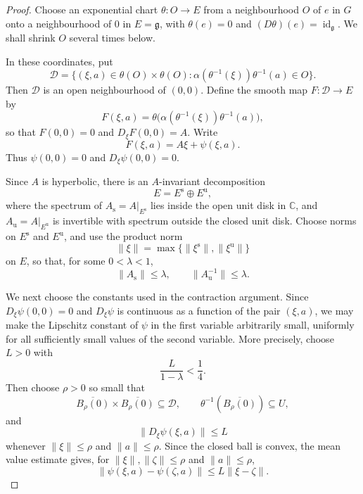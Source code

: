 \documentclass[12pt]{amsart}
\theoremstyle{definition}
\numberwithin{equation}{section}
\theoremstyle{remark}
\begin{document}
\begin{proof}
Choose an exponential chart $\theta:O\to E$ from a neighbourhood $O$ of
$e$ in $G$ onto a neighbourhood of $0$ in $E=\mathfrak g$, with
$\theta(e)=0$ and $(D\theta)(e)=\operatorname{id}_{\mathfrak g}$. We shall
shrink $O$ several times below.

In these coordinates, put
\[
\mathcal D=\{(\xi,a)\in\theta(O)\times\theta(O):
\alpha(\theta^{-1}(\xi))\theta^{-1}(a)\in O\}.
\]
Then $\mathcal D$ is an open neighbourhood of $(0,0)$. Define the smooth
map $F:\mathcal D\to E$ by
\[
F(\xi,a)=\theta\bigl(\alpha(\theta^{-1}(\xi))\theta^{-1}(a)\bigr),
\]
so that $F(0,0)=0$ and $D_\xi F(0,0)=A$. Write
\[
F(\xi,a)=A\xi+\psi(\xi,a).
\]
Thus $\psi(0,0)=0$ and $D_\xi\psi(0,0)=0$.

Since $A$ is hyperbolic, there is an $A$-invariant decomposition
\begin{equation}\label{eq:splitting}
E=E^{\mathrm{s}}\oplus E^{\mathrm{u}},
\end{equation}
where the spectrum of $A_{\mathrm{s}}=A|_{E^{\mathrm{s}}}$ lies inside the
open unit disk in $\mathbb{C}$, and $A_{\mathrm{u}}=A|_{E^{\mathrm{u}}}$ is invertible with
spectrum outside the closed unit disk. Choose norms on
$E^{\mathrm{s}}$ and $E^{\mathrm{u}}$, and use the product norm
\[
\|\xi\|=\max\{\|\xi^{\mathrm{s}}\|,\|\xi^{\mathrm{u}}\|\}
\]
on $E$, so that, for some $0<\lambda<1$,
\begin{equation}\label{eq:lambda-estimate}
\|A_{\mathrm{s}}\|\leq\lambda,\qquad
\|A_{\mathrm{u}}^{-1}\|\leq\lambda.
\end{equation}

We next choose the constants used in the contraction argument. Since
$D_\xi\psi(0,0)=0$ and $D_\xi\psi$ is continuous as a function of the pair
$(\xi,a)$, we may make the Lipschitz constant of $\psi$ in the first
variable arbitrarily small, uniformly for all sufficiently small values of
the second variable. More precisely, choose $L>0$ with
\begin{equation}\label{eq:L-small}
\frac{L}{1-\lambda}<\frac14.
\end{equation}
Then choose $\rho>0$ so small that
\[
\overline{B_\rho(0)}\times\overline{B_\rho(0)}\subseteq\mathcal D,
\qquad
\theta^{-1}(\overline{B_\rho(0)})\subseteq U,
\]
and
\[
\|D_\xi\psi(\xi,a)\|\leq L
\]
whenever $\|\xi\|\leq\rho$ and $\|a\|\leq\rho$. Since the closed ball is
convex, the mean value estimate gives, for
$\|\xi\|,\|\zeta\|\leq\rho$ and $\|a\|\leq\rho$,
\begin{equation}\label{eq:psi-lipschitz}
\|\psi(\xi,a)-\psi(\zeta,a)\|\leq L\|\xi-\zeta\|.
\end{equation}


\end{proof}
\end{document}
